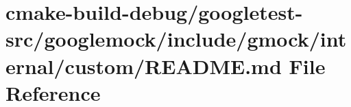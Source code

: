 \hypertarget{cmake-build-debug_2googletest-src_2googlemock_2include_2gmock_2internal_2custom_2README_8md}{}\section{cmake-\/build-\/debug/googletest-\/src/googlemock/include/gmock/internal/custom/\+R\+E\+A\+D\+ME.md File Reference}
\label{cmake-build-debug_2googletest-src_2googlemock_2include_2gmock_2internal_2custom_2README_8md}
